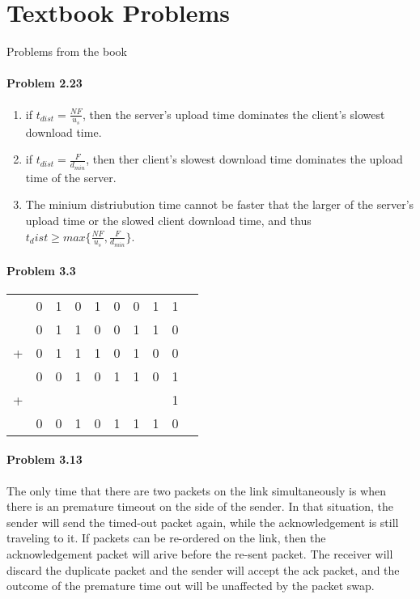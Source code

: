 \documentclass[12pt]{article}
\title{\class{}\assign{}\hwNum{}}
\author{\name{}}
\date{\displaydate{date}}
\begin{document}
\maketitle
\newpage

\section{Textbook Problems}
Problems from the book

\paragraph{Problem 2.23}
\begin{enumerate}[label=\textbf{Question \arabic*)}]
	\item if $t_{dist} = \frac{NF}{u_s}$, then the server's upload time dominates the client's slowest download time.
	\item if $t_{dist} = \frac{F}{d_{min}}$, then ther client's slowest download time dominates the upload time of the server.
	\item The minium distriubution time cannot be faster that the larger of the server's upload time or the slowed client download time, and thus $t_dist \geq max\{ \frac{NF}{ u_s}, \frac{F}{ d_{min}} \}$.
\end{enumerate}

\paragraph{Problem 3.3}
\begin{tabular}{c*{9}{@{\,}c}}
	    & 0&1&0&1&0&0&1&1 \\
	    & 0&1&1&0&0&1&1&0 \\
	+ & 0&1&1&1&0&1&0&0 \\
	\hline
	& 0&0&1&0&1&1&0&1\\
	+ &&&&&&&&1\\
	\hline
	&0&0&1&0&1&1&1&0\\
\end{tabular}

\paragraph{Problem 3.13}
The only time that there are two packets on the link simultaneously is when there is an premature timeout on the side of the sender. In that situation, the sender will send the timed-out packet again, while the acknowledgement is still traveling to it. If packets can be re-ordered on the link, then the acknowledgement packet will arive before the re-sent packet. The receiver will discard the duplicate packet and the sender will accept the ack packet, and the outcome of the premature time out will be unaffected by the packet swap.
\end{document}
